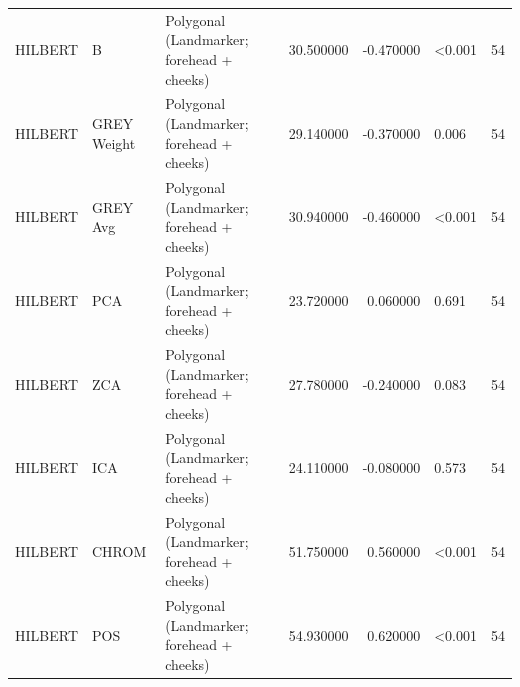 \begin{table}[htbp]
\begin{tabular}{l l l r r l r}
HILBERT & B & Polygonal (Landmarker; forehead + cheeks) & 30.500000 & -0.470000 & <0.001 & 54 \\
HILBERT & GREY Weight & Polygonal (Landmarker; forehead + cheeks) & 29.140000 & -0.370000 & 0.006 & 54 \\
HILBERT & GREY Avg & Polygonal (Landmarker; forehead + cheeks) & 30.940000 & -0.460000 & <0.001 & 54 \\
HILBERT & PCA & Polygonal (Landmarker; forehead + cheeks) & 23.720000 & 0.060000 & 0.691 & 54 \\
HILBERT & ZCA & Polygonal (Landmarker; forehead + cheeks) & 27.780000 & -0.240000 & 0.083 & 54 \\
HILBERT & ICA & Polygonal (Landmarker; forehead + cheeks) & 24.110000 & -0.080000 & 0.573 & 54 \\
HILBERT & CHROM & Polygonal (Landmarker; forehead + cheeks) & 51.750000 & 0.560000 & <0.001 & 54 \\
HILBERT & POS & Polygonal (Landmarker; forehead + cheeks) & 54.930000 & 0.620000 & <0.001 & 54 \\
\bottomrule
\end{tabular}

\end{table}
